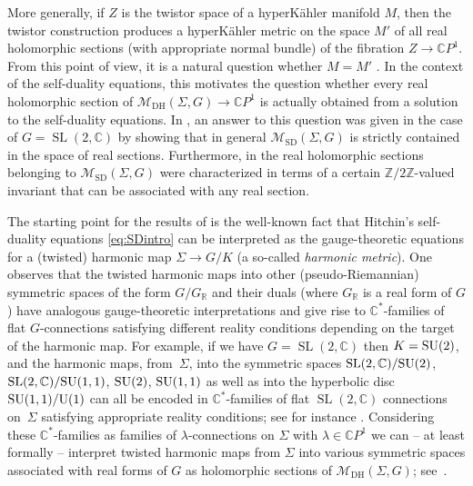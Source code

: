 \documentclass[pdftex]{sigma}
\numberwithin{equation}{section}
\theoremstyle{definition}
\newcommand\C{{\mathbb C}}
\newcommand{\R}{{\mathbb R}}
\begin{document}
More generally, if $Z$ is the twistor space of a hyperK\"ahler manifold $M$, then the twistor construction produces a hyperK\"ahler metric on the space $M'$ of all real holomorphic sections (with
appropriate normal bundle) of the fibration $Z \longrightarrow \C P^1$. From this point of view, it is a natural question
whether $M = M'$ \cite{Si-Hodge}. In the context of the self-duality equations, this motivates the question whether every real holomorphic section of $\mathcal{M}_{\mathrm{DH}}(\Sigma,G) \longrightarrow \C P^1$ is actually obtained from a solution to
the self-duality
equations. In \cite{BHR}, an answer to this question was given in the case of $G = \operatorname{SL}(2,\C)$ by showing that in
general $\mathcal{M}_{\mathrm{SD}}(\Sigma, G)$ is strictly contained in the space of real sections. Furthermore, in \cite{BHR} the real
holomorphic sections belonging to $\mathcal{M}_{\mathrm{SD}}(\Sigma, G)$ were characterized in terms of a certain $\mathbb{Z}/2\mathbb{Z}$-valued
invariant that can be associated with any real section.

The starting point for the results of \cite{BHR} is the well-known fact that Hitchin's self-duality equations \eqref{eq:SDintro} can be
interpreted as the gauge-theoretic equations for a (twisted) harmonic map $\Sigma \longrightarrow G/K$
(a so-called \emph{harmonic metric}).
One observes that the twisted harmonic maps into other (pseudo-Riemannian) symmetric spaces of the form $G/G_{\R}$
and their duals (where $G_\R$ is a real form of $G$) have analogous gauge-theoretic interpretations and give rise to $\C^*$-families of flat
$G$-connections satisfying different reality conditions depending on the target of the harmonic map.
For example, if we have $G = \operatorname{SL}(2,\C)$ then $K = {\rm SU}(2)$, and the harmonic maps, from~$\Sigma$, into the symmetric spaces
$\operatorname{SL}(2,\C)/{\rm SU}(2)$, $\operatorname{SL}(2,\C)/{\rm SU}(1,1)$, ${\rm SU}(2)$, ${\rm SU}(1,1)$ as well as into the hyperbolic disc
${\rm SU}(1,1)/{\rm U}(1)$ can all be encoded in $\C^*$-families of flat $\operatorname{SL}(2,\C)$ connections on~$\Sigma$ satisfying appropriate
reality conditions; see for instance \cite{DPW,Hitchin90,Pohl,Uh}.
Considering these $\C^*$-families as families of $\lambda$-connections on $\Sigma$ with $\lambda \in \C P^1$ we can --
at least formally -- interpret twisted harmonic maps from $\Sigma$ into various symmetric spaces associated
with real forms of $G$ as holomorphic sections of $\mathcal{M}_{\mathrm{DH}}(\Sigma, G)$; see~\cite{BHR}.
\end{document}
